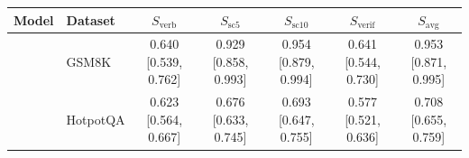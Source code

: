 \begin{tabular}{llccccc}
\toprule
Model & Dataset & $S_{\text{verb}}$ & $S_{\text{sc5}}$ & $S_{\text{sc10}}$ & $S_{\text{verif}}$ & $S_{\text{avg}}$ \\
\midrule
\modelA{} & GSM8K & 0.640 [0.539, 0.762] & 0.929 [0.858, 0.993] & 0.954 [0.879, 0.994] & 0.641 [0.544, 0.730] & 0.953 [0.871, 0.995] \\
\modelA{} & HotpotQA & 0.623 [0.564, 0.667] & 0.676 [0.633, 0.745] & 0.693 [0.647, 0.755] & 0.577 [0.521, 0.636] & 0.708 [0.655, 0.759] \\
\bottomrule
\end{tabular}
